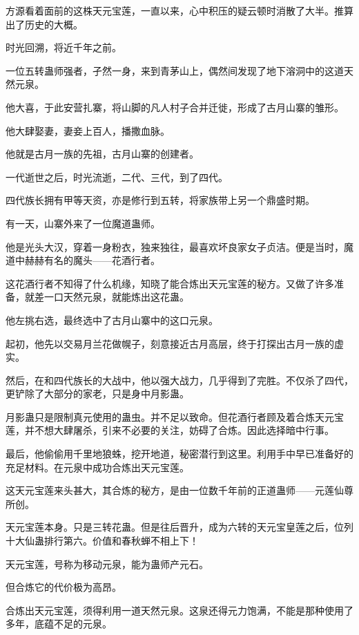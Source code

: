 
\begin{this_body}

方源看着面前的这株天元宝莲，一直以来，心中积压的疑云顿时消散了大半。推算出了历史的大概。

时光回溯，将近千年之前。

一位五转蛊师强者，孑然一身，来到青茅山上，偶然间发现了地下溶洞中的这道天然元泉。

他大喜，于此安营扎寨，将山脚的凡人村子合并迁徙，形成了古月山寨的雏形。

他大肆娶妻，妻妾上百人，播撒血脉。

他就是古月一族的先祖，古月山寨的创建者。

一代逝世之后，时光流逝，二代、三代，到了四代。

四代族长拥有甲等天资，亦是修行到五转，将家族带上另一个鼎盛时期。

有一天，山寨外来了一位魔道蛊师。

他是光头大汉，穿着一身粉衣，独来独往，最喜欢坏良家女子贞洁。便是当时，魔道中赫赫有名的魔头——花酒行者。

这花酒行者不知得了什么机缘，知晓了能合炼出天元宝莲的秘方。又做了许多准备，就差一口天然元泉，就能炼出这花蛊。

他左挑右选，最终选中了古月山寨中的这口元泉。

起初，他先以交易月兰花做幌子，刻意接近古月高层，终于打探出古月一族的虚实。

然后，在和四代族长的大战中，他以强大战力，几乎得到了完胜。不仅杀了四代，更铲除了大部分的家老，只是身中月影蛊。

月影蛊只是限制真元使用的蛊虫。并不足以致命。但花酒行者顾及着合炼天元宝莲，并不想大肆屠杀，引来不必要的关注，妨碍了合炼。因此选择暗中行事。

最后，他偷偷用千里地狼蛛，挖开地道，秘密潜行到这里。利用手中早已准备好的充足材料。在元泉中成功合炼出天元宝莲。

这天元宝莲来头甚大，其合炼的秘方，是由一位数千年前的正道蛊师——元莲仙尊所创。

天元宝莲本身。只是三转花蛊。但是往后晋升，成为六转的天元宝皇莲之后，位列十大仙蛊排行第六。价值和春秋蝉不相上下！

天元宝莲，号称为移动元泉，能为蛊师产元石。

但合炼它的代价极为高昂。

合炼出天元宝莲，须得利用一道天然元泉。这泉还得元力饱满，不能是那种使用了多年，底蕴不足的元泉。


\end{this_body}
